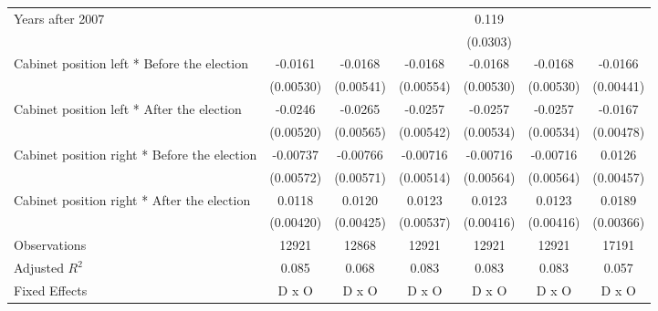 \begin{table}[htbp]
\begin{tabular}{l*{6}{c}}
Years after 2007    &                     &                     &                     &       0.119\sym{***}&                     &                     \\
                    &                     &                     &                     &    (0.0303)         &                     &                     \\
[1em]
Cabinet position left * Before the election&     -0.0161\sym{**} &     -0.0168\sym{**} &     -0.0168\sym{**} &     -0.0168\sym{**} &     -0.0168\sym{**} &     -0.0166\sym{***}\\
                    &   (0.00530)         &   (0.00541)         &   (0.00554)         &   (0.00530)         &   (0.00530)         &   (0.00441)         \\
[1em]
Cabinet position left * After the election&     -0.0246\sym{***}&     -0.0265\sym{***}&     -0.0257\sym{***}&     -0.0257\sym{***}&     -0.0257\sym{***}&     -0.0167\sym{**} \\
                    &   (0.00520)         &   (0.00565)         &   (0.00542)         &   (0.00534)         &   (0.00534)         &   (0.00478)         \\
[1em]
Cabinet position right * Before the election&    -0.00737         &    -0.00766         &    -0.00716         &    -0.00716         &    -0.00716         &      0.0126\sym{**} \\
                    &   (0.00572)         &   (0.00571)         &   (0.00514)         &   (0.00564)         &   (0.00564)         &   (0.00457)         \\
[1em]
Cabinet position right * After the election&      0.0118\sym{**} &      0.0120\sym{**} &      0.0123\sym{*}  &      0.0123\sym{**} &      0.0123\sym{**} &      0.0189\sym{***}\\
                    &   (0.00420)         &   (0.00425)         &   (0.00537)         &   (0.00416)         &   (0.00416)         &   (0.00366)         \\
\hline
Observations        &       12921         &       12868         &       12921         &       12921         &       12921         &       17191         \\
Adjusted \(R^{2}\)  &       0.085         &       0.068         &       0.083         &       0.083         &       0.083         &       0.057         \\
Fixed Effects       &       D x O         &       D x O         &       D x O         &       D x O         &       D x O         &       D x O         \\

\end{tabular}
\end{table}
